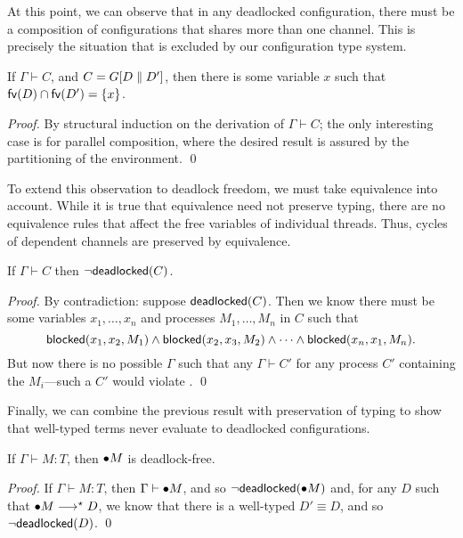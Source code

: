 \documentclass[orivec,envcountsame]{llncs}
\begin{document}
At this point, we can observe that in any deadlocked configuration, there must be a composition of
configurations that shares more than one channel.  This is precisely the situation that is excluded
by our configuration type system.

\begin{lemma}\label{thm:procs-share-one-channel}
  If $\Gamma \vdash C$, and $C = G[D \parallel D']$, then there is some variable $x$ such that
  $\mathsf{fv}(D) \cap \mathsf{fv}(D') = \{ x \}$.
\end{lemma}

\begin{proof}
  By structural induction on the derivation of $\Gamma \vdash C$; the only interesting case is for
  parallel composition, where the desired result is assured by the partitioning of the
  environment. \qed
\end{proof}

To extend this observation to deadlock freedom, we must take equivalence into account.  While it is
true that equivalence need not preserve typing, there are no equivalence rules that affect the free
variables of individual threads.  Thus, cycles of dependent channels are preserved by equivalence.

\begin{lemma}\label{thm:typed-configs-df}
  If $\Gamma \vdash C$ then $\lnot \mathsf{deadlocked}(C)$.
\end{lemma}

\begin{proof}
  By contradiction: suppose $\mathsf{deadlocked}(C)$.  Then we know there must be some variables
  $x_1,\dots,x_n$ and processes $M_1,\dots,M_n$ in $C$ such that
  \[
    \mathsf{blocked}(x_1,x_2,M_1) \land \mathsf{blocked}(x_2,x_3,M_2) \land \cdots \land \mathsf{blocked}(x_n,x_1,M_n).
  \]
  But now there is no possible $\Gamma$ such that any $\Gamma \vdash C'$ for any process $C'$
  containing the $M_i$---such a $C'$ would violate .  \qed
\end{proof}

Finally, we can combine the previous result with preservation of typing to show that well-typed
terms never evaluate to deadlocked configurations.

\begin{theorem}\label{thm:typed-terms-df}
  If $\Gamma \vdash M: T$, then ${\mathord{\bullet}} M$ is deadlock-free.
\end{theorem}

\begin{proof}
  If $\Gamma \vdash M: T$, then $\Gamma \vdash {\mathord{\bullet}} M$, and so
  $\lnot\mathsf{deadlocked}({\mathord{\bullet}} M)$ and, for any $D$ such that ${\mathord{\bullet}} M \longrightarrow^\star D$, we
  know that there is a well-typed $D' \equiv D$, and so $\lnot\mathsf{deadlocked}(D)$. \qed
\end{proof}
\end{document}
